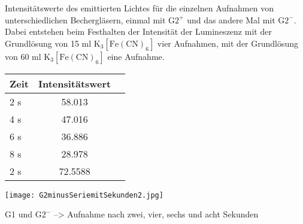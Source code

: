 \begin{dsatable}
 \caption{Intensitätswerte des emittierten Lichtes für die einzelnen Aufnahmen von unterschiedlichen          Bechergläsern, einmal mit $\mathrm{G}2^+$ und das andere Mal mit $\mathrm{G}2^-$. Dabei entstehen beim Festhalten der Intensität der Lumineszenz mit der Grundlösung von 15 ml $\mathrm{K}_3[\mathrm{Fe}(\mathrm{CN})_6]$ vier Aufnahmen, mit der Grundlösung von 60 ml $\mathrm{K}_3[\mathrm{Fe}(\mathrm{CN})_6]$ eine Aufnahme.}
 \centering
 \begin{tabular}{lcr}
  \toprule
   Zeit            & Intensitätswert\\
  \midrule
   2 s			   & 58.013\\
   4 s		       & 47.016\\
   6 s		       & 36.886\\
   8 s		       & 28.978\\
  \midrule
   2 s		       & 72.5588\\
  \bottomrule
 \end{tabular}
 \label{dsatable:beispiel0}
\end{dsatable}

\begin{dsafigure}
 \centering
 \texttt{[image: G2minusSeriemitSekunden2.jpg]}
 \caption{G1 und $\mathrm{G}2^-$ --> Aufnahme nach zwei, vier, sechs und acht Sekunden}
 \label{dsafigure:beispiel1}
\end{dsafigure} 
